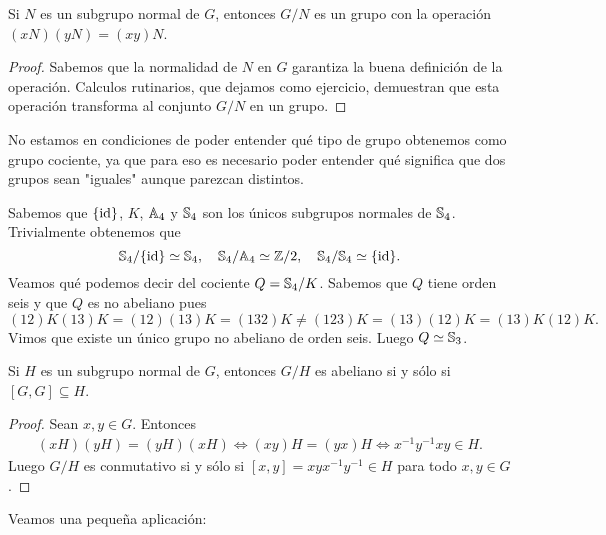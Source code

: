 \begin{theorem}
\label{Grupo!cociente}
Si $N$ es un subgrupo normal de $G$, entonces $G/N$ es un grupo con la operación $(xN)(yN)=(xy)N$.  
\end{theorem}

\begin{proof}
Sabemos que la normalidad de $N$ en $G$ garantiza la buena definición de la operación. Calculos rutinarios, que dejamos como ejercicio, demuestran que 
esta operación transforma al conjunto $G/N$ en un grupo. 
\end{proof}

No estamos en condiciones de poder entender qué tipo de grupo obtenemos
como grupo cociente, ya que para eso es necesario poder entender qué significa 
que dos grupos sean "iguales" aunque parezcan distintos. 
 
\begin{example}
	Sabemos que $\{\operatorname{id}\}$, $K$, $\mathbb{A}_4$ y $\mathbb{S}_4$ son los únicos subgrupos normales de $\mathbb{S}_4$. Trivialmente 
	obtenemos que
	\[
	\mathbb{S}_4/\{\operatorname{id}\}\simeq\mathbb{S}_4,\quad
	\mathbb{S}_4/\mathbb{A}_4\simeq\mathbb{Z}/2,\quad
	\mathbb{S}_4/\mathbb{S}_4\simeq\{\operatorname{id}\}.
	\]
	Veamos qué podemos decir del cociente $Q=\mathbb{S}_4/K$. Sabemos que $Q$ tiene orden seis y que $Q$ es no abeliano pues
	\[
	(12)K(13)K=(12)(13)K=(132)K\ne (123)K=(13)(12)K=(13)K(12)K.
	\]
	Vimos que existe un único grupo no abeliano de orden seis. Luego $Q\simeq\mathbb{S}_3$. 
\end{example}


\begin{proposition}
Si $H$ es un subgrupo normal de $G$, entonces $G/H$ es abeliano si y sólo si $[G,G]\subseteq H$. 
\end{proposition}

\begin{proof}
Sean $x,y\in G$. Entonces 
\begin{align*}
    (xH)(yH)=(yH)(xH) \Longleftrightarrow (xy)H=(yx)H \Longleftrightarrow x^{-1}y^{-1}xy\in H.
\end{align*}
Luego $G/H$ es conmutativo si y sólo si $[x,y]=xyx^{-1}y^{-1}\in H$ para todo $x,y\in G$. 
\end{proof}

Veamos una pequeña aplicación:

